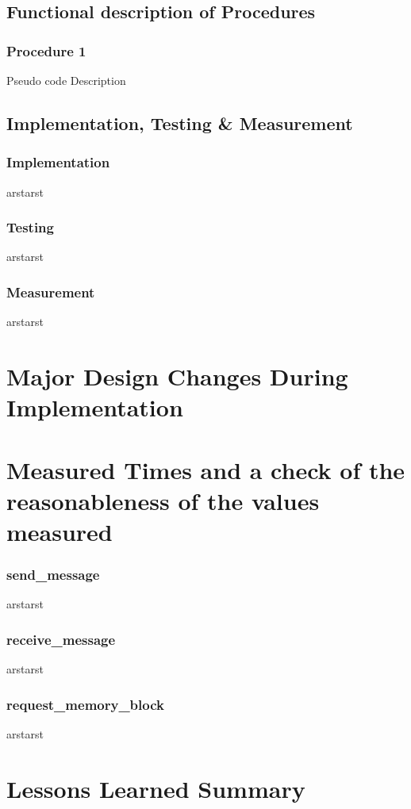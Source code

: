 \documentclass[12pt]{report}
\begin{document}
\chapter{Functional description of Procedures}

\section{Procedure 1}
    Pseudo code
    Description

\chapter{Implementation, Testing \& Measurement}

\section{Implementation}
    arstarst

\section{Testing}
    arstarst

\section{Measurement}
    arstarst

\part{Major Design Changes During Implementation}

\part{Measured Times and a check of the reasonableness of the values measured}

\section{send_message}
    arstarst

\section{receive_message}
    arstarst

\section{request_memory_block}
    arstarst

\part{Lessons Learned Summary}
\end{document}
